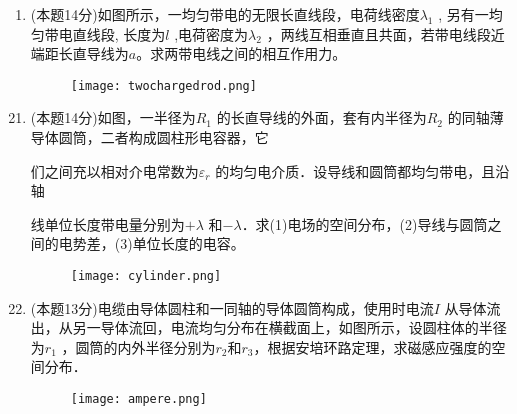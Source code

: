 \documentclass[11pt,twoside]{article}
\begin{document}
\begin{spacing}{1.3}
\begin{enumerate}
\begin{figure}[h]
\end{figure}


\item (本题14分)如图所示，一均匀带电的无限长直线段，电荷线密度$\lambda_1$ , 另有一均匀带电直线段, 长度为$l$ ,电荷密度为$\lambda_2$ ，两线互相垂直且共面，若带电线段近端距长直导线为$a$。求两带电线之间的相互作用力。%

\begin{figure}[h]

\raggedleft%


\texttt{[image: twochargedrod.png]}


\end{figure}

\end{enumerate}

\newpage

\begin{enumerate}\setcounter{enumi}{20}

\item (本题14分)如图，一半径为$R_1$ 的长直导线的外面，套有内半径为$R_2$ 的同轴薄导体圆筒，二者构成圆柱形电容器，它

们之间充以相对介电常数为$\varepsilon_r$ 的均匀电介质．设导线和圆筒都均匀带电，且沿轴

线单位长度带电量分别为$+\lambda$ 和$-\lambda$．求(1)电场的空间分布，(2)导线与圆筒之间的电势差，(3)单位长度的电容。

\begin{figure}[h]

\raggedleft%


\texttt{[image: cylinder.png]}


\end{figure}

\item (本题13分)电缆由导体圆柱和一同轴的导体圆筒构成，使用时电流$I$ 从导体流出，从另一导体流回，电流均匀分布在横截面上，如图所示，设圆柱体的半径为$r_1$ ，圆筒的内外半径分别为$r_2$和$r_3$，根据安培环路定理，求磁感应强度的空间分布．%

\begin{figure}[h]

\raggedleft%


\texttt{[image: ampere.png]}


\end{figure}

\end{enumerate}

\end{spacing}

\clearpage
\end{document}
